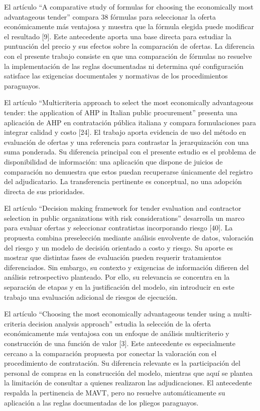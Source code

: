 \documentclass[12pt,a4paper]{article}
\begin{document}
El artículo ``A comparative study of formulas for choosing the economically most advantageous tender'' compara 38 fórmulas para seleccionar la oferta económicamente más ventajosa y muestra que la fórmula elegida puede modificar el resultado [9]. Este antecedente aporta una base directa para estudiar la puntuación del precio y sus efectos sobre la comparación de ofertas. La diferencia con el presente trabajo consiste en que una comparación de fórmulas no resuelve la implementación de las reglas documentadas ni determina qué configuración satisface las exigencias documentales y normativas de los procedimientos paraguayos.

El artículo ``Multicriteria approach to select the most economically advantageous tender: the application of AHP in Italian public procurement'' presenta una aplicación de AHP en contratación pública italiana y compara formulaciones para integrar calidad y costo [24]. El trabajo aporta evidencia de uso del método en evaluación de ofertas y una referencia para contrastar la jerarquización con una suma ponderada. Su diferencia principal con el presente estudio es el problema de disponibilidad de información: una aplicación que dispone de juicios de comparación no demuestra que estos puedan recuperarse únicamente del registro del adjudicatario. La transferencia pertinente es conceptual, no una adopción directa de sus prioridades.

El artículo ``Decision making framework for tender evaluation and contractor selection in public organizations with risk considerations'' desarrolla un marco para evaluar ofertas y seleccionar contratistas incorporando riesgo [40]. La propuesta combina preselección mediante análisis envolvente de datos, valoración del riesgo y un modelo de decisión orientado a costo y riesgo. Su aporte es mostrar que distintas fases de evaluación pueden requerir tratamientos diferenciados. Sin embargo, su contexto y exigencias de información difieren del análisis retrospectivo planteado. Por ello, su relevancia se concentra en la separación de etapas y en la justificación del modelo, sin introducir en este trabajo una evaluación adicional de riesgos de ejecución.

El artículo ``Choosing the most economically advantageous tender using a multi-criteria decision analysis approach'' estudia la selección de la oferta económicamente más ventajosa con un enfoque de análisis multicriterio y construcción de una función de valor [3]. Este antecedente es especialmente cercano a la comparación propuesta por conectar la valoración con el procedimiento de contratación. Su diferencia relevante es la participación del personal de compras en la construcción del modelo, mientras que aquí se plantea la limitación de consultar a quienes realizaron las adjudicaciones. El antecedente respalda la pertinencia de MAVT, pero no resuelve automáticamente su aplicación a las reglas documentadas de los pliegos paraguayos.
\end{document}
